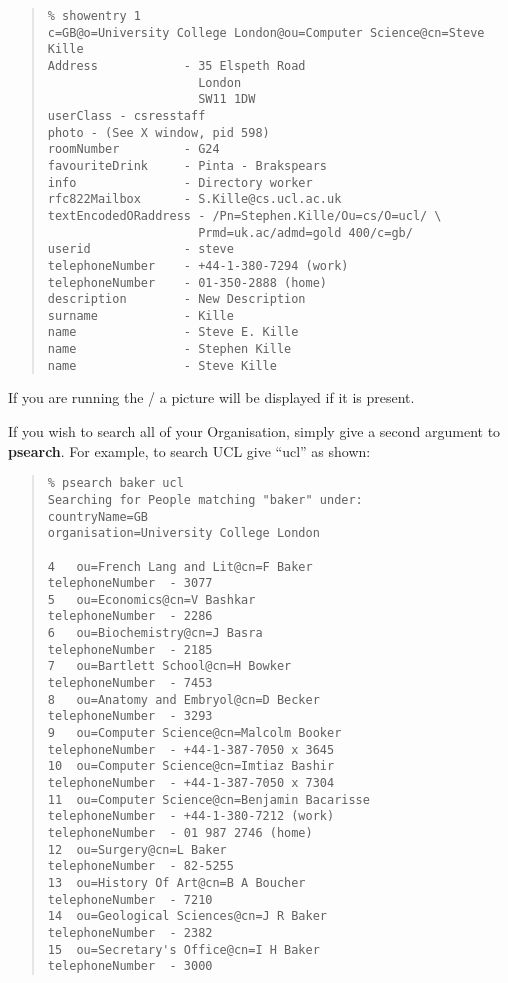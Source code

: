 \begin{quote}\smaller\begin{verbatim}
% showentry 1
c=GB@o=University College London@ou=Computer Science@cn=Steve Kille
Address            - 35 Elspeth Road
                     London
                     SW11 1DW
userClass - csresstaff
photo - (See X window, pid 598)
roomNumber         - G24
favouriteDrink     - Pinta - Brakspears
info               - Directory worker
rfc822Mailbox      - S.Kille@cs.ucl.ac.uk
textEncodedORaddress - /Pn=Stephen.Kille/Ou=cs/O=ucl/ \
                     Prmd=uk.ac/admd=gold 400/c=gb/
userid             - steve
telephoneNumber    - +44-1-380-7294 (work)
telephoneNumber    - 01-350-2888 (home)
description        - New Description
surname            - Kille
name               - Steve E. Kille
name               - Stephen Kille
name               - Steve Kille
\end{verbatim}\end{quote}

If you are running the \xwindows/ a picture will be displayed if it is present.

If you wish to search all of your Organisation, simply give a second argument 
to {\bf
psearch}.  For example, to search UCL give ``ucl'' as shown:

\begin{quote}\small\begin{verbatim}
% psearch baker ucl
Searching for People matching "baker" under:
countryName=GB
organisation=University College London

4   ou=French Lang and Lit@cn=F Baker
telephoneNumber  - 3077
5   ou=Economics@cn=V Bashkar
telephoneNumber  - 2286
6   ou=Biochemistry@cn=J Basra
telephoneNumber  - 2185
7   ou=Bartlett School@cn=H Bowker
telephoneNumber  - 7453
8   ou=Anatomy and Embryol@cn=D Becker
telephoneNumber  - 3293
9   ou=Computer Science@cn=Malcolm Booker
telephoneNumber  - +44-1-387-7050 x 3645 
10  ou=Computer Science@cn=Imtiaz Bashir
telephoneNumber  - +44-1-387-7050 x 7304 
11  ou=Computer Science@cn=Benjamin Bacarisse
telephoneNumber  - +44-1-380-7212 (work)
telephoneNumber  - 01 987 2746 (home)
12  ou=Surgery@cn=L Baker
telephoneNumber  - 82-5255
13  ou=History Of Art@cn=B A Boucher
telephoneNumber  - 7210
14  ou=Geological Sciences@cn=J R Baker
telephoneNumber  - 2382
15  ou=Secretary's Office@cn=I H Baker
telephoneNumber  - 3000
\end{verbatim}\end{quote}

\pagebreak[3]
